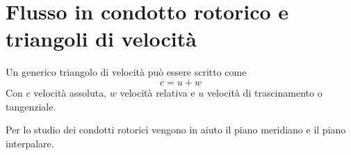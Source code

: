 \documentclass[a4paper, 15pt]{article}
\begin{document}
\section{Flusso in condotto rotorico e triangoli di velocità}
\begin{adjustwidth}{2in}{}
	Un generico triangolo di velocità può essere scritto come
	\[c = u + w \]
	Con $c$ velocità assoluta, $w$ velocità relativa e $u$ velocità di trascinamento o tangenziale. 	
	

	Per lo studio dei condotti rotorici vengono in aiuto il piano meridiano e il piano interpalare. \newline 
	

\end{adjustwidth}
\end{document}
